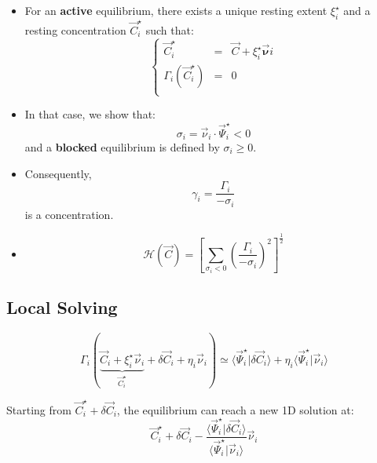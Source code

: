 \documentclass[aps,12pt]{revtex4}
\begin{document}
\begin{itemize}
\item For an {\bf active} equilibrium, there exists a unique resting extent $\xi_i^\star$ and a resting concentration $\vec{C}_i^\star$ such that:
\begin{equation}
\left\lbrace
\begin{array}{rcl}
	\vec{C}_i^\star & = & \vec{C} + \xi_i^\star \vec{\bm{\nu}}i\\
	\Gamma_i(\vec{C}_i^\star) & = & 0 \\
\end{array}
\right.
\end{equation}

\item In that case, we show that:
\begin{equation}
	\sigma_i = \vec{\nu}_i \cdot \vec{\Psi}_i^\star < 0
\end{equation}	
and a {\bf blocked} equilibrium is defined by $\sigma_i\geq 0$.

\item Consequently,
\begin{equation}
	\gamma_i = \dfrac{\Gamma_i}{-\sigma_i} 
\end{equation}
is a concentration.

\item \begin{equation}
\mathcal{H}(\vec{C}) = \left\lbrack\sum_{\sigma_i<0} \left(\dfrac{\Gamma_i}{-\sigma_i}\right)^2 \right\rbrack^{\frac{1}{2}}
\end{equation}

 
\end{itemize}
 
\subsection{Local Solving}

	
\begin{equation}
	\Gamma_i ( \underbrace{\vec{C}_i + \xi_i^\star \vec{\nu}_i}_{\vec{C}_i^\star} + \delta\vec{C}_i + \eta_i \vec{\nu}_i  ) \simeq 
	\langle \vec{\Psi}_i^\star \vert \delta\vec{C}_i \rangle + \eta_i \langle \vec{\Psi}_i^\star \vert \vec{\nu}_i \rangle
\end{equation}

Starting from $\vec{C}_i^\star + \delta\vec{C}_i$, the equilibrium can reach a new 1D solution at:
\begin{equation}
	\vec{C}_i^\star + \delta\vec{C}_i - \dfrac{\langle \vec{\Psi}_i^\star \vert \delta\vec{C}_i \rangle}{\langle \vec{\Psi}_i^\star \vert \vec{\nu}_i \rangle
} \vec{\nu}_i
\end{equation}
\end{document}
